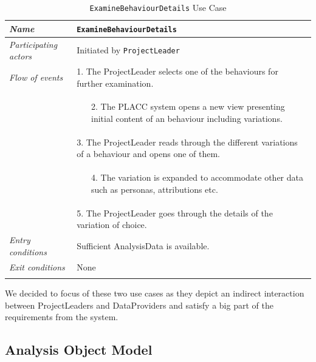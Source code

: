 \begin{longtable}[ht]{ p{}  p{} }
\caption{\texttt{ExamineBehaviourDetails} Use Case}
\label{tab:UseCaseTwo}\\
\hline
\textit{Name} & \texttt{ExamineBehaviourDetails} \\
    \hline
   \textit{Participating actors} & Initiated by \texttt{ProjectLeader} \\
   \hline
   \textit{Flow of events} &  1.  The ProjectLeader selects one of the behaviours for further examination. \\
   &  \vspace{-1.5pc}\begin{enumerate}
   \item [2.] The PLACC system opens a new view presenting initial content of an behaviour including variations. 
   \end{enumerate} \\
   & 3.  The ProjectLeader reads through the different variations of a behaviour and opens one of them. \\
   & \vspace{-1.5pc}\begin{enumerate}
   \item [4.]  The variation is expanded to accommodate other data such as personas, attributions etc. 
   \end{enumerate} \\
   & 5. The ProjectLeader goes through the details of the variation of choice. \\
   \hline
   \textit{Entry conditions} &  Sufficient AnalysisData is available. \\
    \hline
     \textit{Exit conditions} &  None \\
      \hline
\label{tab:multicol}
\end{longtable}

We decided to focus of these two use cases as they depict an indirect interaction between ProjectLeaders and DataProviders and satisfy a big part of the requirements from the system. 


\subsection{Analysis Object Model}


